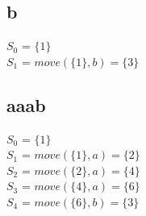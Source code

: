\documentclass[12pt, A4]{article}
\begin{document}
	\subsection{b}
	
	$S_0$ = $\{1\}$\\
	$S_1$ = $move(\{1\}, b) = \{3\}$\\
	
	\subsection{aaab}
	
	$S_0$ = $\{1\}$\\
	$S_1$ = $move(\{1\}, a) = \{2\}$\\
	$S_2$ = $move(\{2\}, a) = \{4\}$\\
	$S_3$ = $move(\{4\}, a) = \{6\}$\\
	$S_4$ = $move(\{6\}, b) = \{3\}$\\
	
\end{document}
